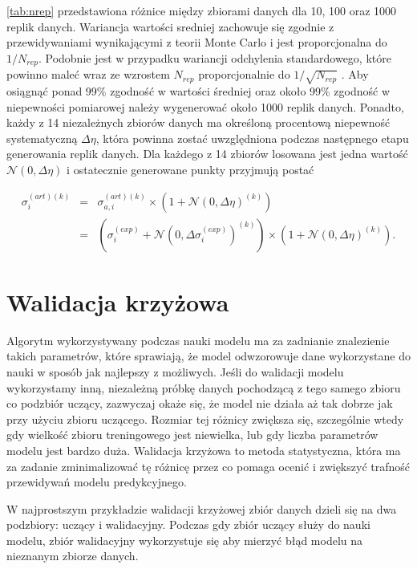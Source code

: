 \documentclass[11pt]{book}
\theoremstyle{definition}
\begin{document}
\tablename{} \ref{tab:nrep} przedstawiona różnice między zbiorami danych dla 10, 100 oraz 1000 replik danych. Wariancja wartości sredniej zachowuje się zgodnie z przewidywaniami wynikającymi z teorii Monte Carlo i jest proporcjonalna do $1/N_{rep}$. Podobnie jest w przypadku wariancji odchylenia standardowego, które powinno maleć wraz ze wzrostem $N_{rep}$ proporcjonalnie do $1/\sqrt{N_{rep}}$ \cite{2002JHEP...05..062F}. Aby osiągnąć ponad 99\% zgodność w wartości średniej oraz około 99\% zgodność w niepewności pomiarowej należy wygenerować około 1000 replik danych.
%
Ponadto, każdy z 14 niezależnych zbiorów danych ma określoną procentową niepewność systematyczną $\Delta\eta$, która powinna zostać uwzględniona podczas następnego etapu generowania replik danych. Dla każdego z 14 zbiorów losowana jest jedna wartość $\mathcal{N}\left( 0, \Delta \eta \right)$ i ostatecznie generowane punkty przyjmują postać

\begin{eqnarray}
\sigma^{(art)(k)}_{i}  &=& \sigma^{(art)(k)}_{a,i} \times \left( 1  + \mathcal{N}\left( 0, \Delta \eta \right)^{(k)} \right) \nonumber\\
&=& \left(\sigma_i^{(exp)} + \mathcal{N}\left( 0, \Delta \sigma_i^{(exp)} \right)^{(k)}\right) \times \left( 1  + \mathcal{N}\left( 0, \Delta \eta \right)^{(k)} \right).
\end{eqnarray}


\section{Walidacja krzyżowa}

Algorytm wykorzystywany podczas nauki modelu ma za zadnianie znalezienie takich parametrów, które sprawiają, że model odwzorowuje dane wykorzystane do nauki w sposób jak najlepszy z możliwych. Jeśli do walidacji modelu wykorzystamy inną, niezależną próbkę danych pochodzącą z tego samego zbioru co podzbiór uczący, zazwyczaj okaże się, że model nie działa aż tak dobrze jak przy użyciu zbioru uczącego. Rozmiar tej różnicy zwiększa się, szczególnie wtedy gdy wielkość zbioru treningowego jest niewielka, lub gdy liczba parametrów modelu jest bardzo duża.
Walidacja krzyżowa to metoda statystyczna, która ma za zadanie zminimalizować tę różnicę przez co pomaga ocenić i zwiększyć trafność przewidywań modelu predykcyjnego. 


W najprostszym przykładzie walidacji krzyżowej zbiór danych dzieli się na dwa podzbiory: uczący i walidacyjny. Podczas gdy zbiór uczący służy do nauki modelu, zbiór walidacyjny wykorzystuje się aby mierzyć błąd modelu na nieznanym zbiorze danych. 
\end{document}
